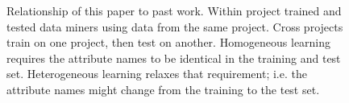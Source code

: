 \begin{figure}[!b]
\centering
{}
 \caption{ Relationship of this paper to past work. Within project trained and
tested data miners using data from the same project. Cross projects train on
one project, then test on another. Homogeneous learning requires
the attribute names to be identical in the training and test set. Heterogeneous learning
relaxes that requirement; i.e. the attribute names might change from the training
to the test set.}\label{fig:analytics}
 \end{figure}